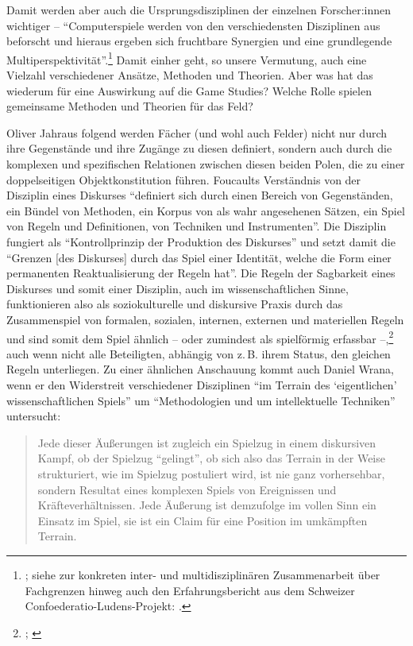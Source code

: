 \documentclass{scrartcl}
\begin{document}
Damit werden aber auch die Ursprungsdisziplinen der einzelnen Forscher:innen wichtiger -- \enquote{Computerspiele werden von den verschiedensten Disziplinen aus beforscht und hieraus ergeben sich fruchtbare Synergien und eine grundlegende Multiperspektivität}.\footnote{\autocite[][S.~26]{unterhuber_wer_2024}; siehe zur konkreten inter- und multidisziplinären Zusammenarbeit über Fachgrenzen hinweg auch den Erfahrungsbericht aus dem Schweizer Confoederatio-Ludens-Projekt: \autocite{bemelmans_bridging_2024}.}
Damit einher geht, so unsere Vermutung, auch eine Vielzahl verschiedener Ansätze, Methoden und Theorien.
Aber was hat das wiederum für eine Auswirkung auf die Game Studies?
Welche Rolle spielen gemeinsame Methoden und Theorien für das Feld?

Oliver Jahraus folgend werden Fächer (und wohl auch Felder) nicht nur durch ihre Gegenstände und ihre Zugänge zu diesen definiert, sondern auch durch die komplexen und spezifischen Relationen zwischen diesen beiden Polen, die zu einer doppelseitigen Objektkonstitution führen.\autocite[Vgl.][S.~6]{jahraus_literaturtheorie_2004}
Foucaults Verständnis von der Disziplin eines Diskurses \enquote{definiert sich durch einen Bereich von Gegenständen, ein Bündel von Methoden, ein Korpus von als wahr angesehenen Sätzen, ein Spiel von Regeln und Definitionen, von Techniken und Instrumenten}.\autocite[][S.~22]{foucault_ordnung_1993}
Die Disziplin fungiert als \enquote{Kontrollprinzip der Produktion des Diskurses} und setzt damit die \enquote{Grenzen [des Diskurses] durch das Spiel einer Identität, welche die Form einer permanenten Reaktualisierung der Regeln hat}.\autocite[][S.~25]{foucault_ordnung_1993}
Die Regeln der Sagbarkeit eines Diskurses und somit einer Disziplin, auch im wissenschaftlichen Sinne, funktionieren also als soziokulturelle und diskursive Praxis durch das Zusammenspiel von formalen, sozialen, internen, externen und materiellen Regeln und sind somit dem Spiel ähnlich -- oder zumindest als spielförmig erfassbar --,\footnote{\autocite[Vgl.][S.~2--3]{stenros_rule_2024}; \autocite[][S.~24--325]{unterhuber_spielgeschichten_nodate}} auch wenn nicht alle Beteiligten, abhängig von z.\,B. ihrem Status, den gleichen Regeln unterliegen.
Zu einer ähnlichen Anschauung kommt auch Daniel Wrana, wenn er den Widerstreit verschiedener Disziplinen \enquote{im Terrain des \enquote{eigentlichen} wissenschaftlichen Spiels} um \enquote{Methodologien und um intellektuelle Techniken} untersucht:\autocite[][S.~49]{wrana_inter-disziplinaritat_2017}

\begin{quote}
   Jede dieser Äußerungen ist zugleich ein Spielzug in einem diskursiven Kampf, ob der Spielzug \enquote{gelingt}, ob sich also das Terrain in der Weise strukturiert, wie im Spielzug postuliert wird, ist nie ganz vorhersehbar, sondern Resultat eines komplexen Spiels von Ereignissen und Kräfteverhältnissen.
   Jede Äußerung ist demzufolge im vollen Sinn ein Einsatz im Spiel, sie ist ein Claim für eine Position im umkämpften Terrain.\autocite[][S.~43]{wrana_inter-disziplinaritat_2017}
\end{quote}
\end{document}
